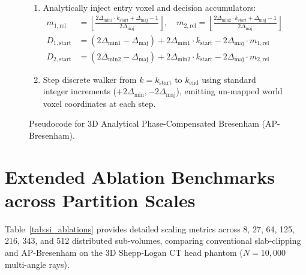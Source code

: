 \documentclass[11pt]{article}
\begin{document}
\begin{figure}[H]
{{\begin{enumerate}
    \textbf{if} $k_{\mathrm{start}} > k_{\mathrm{end}}$ \textbf{then return} $\emptyset$ (ray misses sub-volume).
    \item Analytically inject entry voxel and decision accumulators:
    \begin{align*}
        m_{1,\mathrm{rel}} &= \left\lfloor \frac{2\Delta_{\mathrm{min1}} \cdot k_{\mathrm{start}} + \Delta_{\mathrm{maj}} - 1}{2\Delta_{\mathrm{maj}}} \right\rfloor, \quad m_{2,\mathrm{rel}} = \left\lfloor \frac{2\Delta_{\mathrm{min2}} \cdot k_{\mathrm{start}} + \Delta_{\mathrm{maj}} - 1}{2\Delta_{\mathrm{maj}}} \right\rfloor \\
        D_{1,\mathrm{start}} &= (2\Delta_{\mathrm{min1}} - \Delta_{\mathrm{maj}}) + 2\Delta_{\mathrm{min1}} \cdot k_{\mathrm{start}} - 2\Delta_{\mathrm{maj}} \cdot m_{1,\mathrm{rel}} \\
        D_{2,\mathrm{start}} &= (2\Delta_{\mathrm{min2}} - \Delta_{\mathrm{maj}}) + 2\Delta_{\mathrm{min2}} \cdot k_{\mathrm{start}} - 2\Delta_{\mathrm{maj}} \cdot m_{2,\mathrm{rel}}
    \end{align*}
    \item Step discrete walker from $k = k_{\mathrm{start}}$ to $k_{\mathrm{end}}$ using standard integer increments ($+2\Delta_{\mathrm{min}}, -2\Delta_{\mathrm{maj}}$), emitting un-mapped world voxel coordinates at each step.
\end{enumerate}
}}
\caption{Pseudocode for 3D Analytical Phase-Compensated Bresenham (AP-Bresenham).}
\label{fig:si_algorithm}
\end{figure}

\section{Extended Ablation Benchmarks across Partition Scales}
\label{sec:si_ablations}

Table~\ref{tab:si_ablations} provides detailed scaling metrics across 8, 27, 64, 125, 216, 343, and 512 distributed sub-volumes, comparing conventional slab-clipping and AP-Bresenham on the 3D Shepp-Logan CT head phantom ($N = 10,000$ multi-angle rays).
\end{document}
